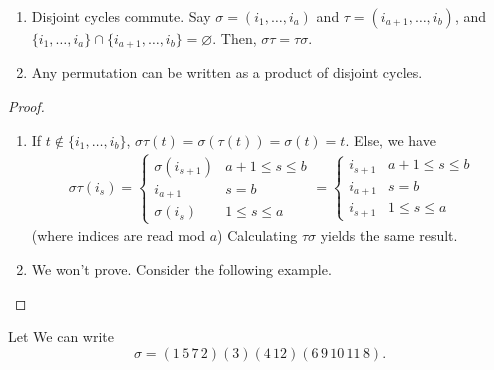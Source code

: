 \documentclass[12pt,oneside]{article}
\begin{document}
\begin{proposition}
  \begin{enumerate}
    \item Disjoint cycles commute. Say $\sigma = (i_1, \dots, i_a)$ and $\tau = (i_{a+1}, \dots, i_b)$, and $\{i_1, \dots, i_a\}\cap \{i_{a+1}, \dots, i_b\} = \varnothing$. Then, $\sigma \tau = \tau \sigma$.
    \item Any permutation can be written as a product of disjoint cycles.
  \end{enumerate}
\end{proposition}

\begin{proof}
  \begin{enumerate}
    \item If $t\notin \{i_1, \dots, i_b\}$, $\sigma \tau(t) = \sigma(\tau(t)) = \sigma (t) = t$. Else, we have \begin{align*}
      \sigma \tau (i_s) = \begin{cases}
        \sigma (i_{s+1}) & a+ 1 \leq s \leq b\\
        i_{a+1} & s = b\\
        \sigma(i_s) & 1 \leq s \leq a
      \end{cases} = \begin{cases}
        i_{s+1} & a+1 \leq s \leq b\\
        i_{a+1} & s = b\\
        i_{s+1} & 1 \leq s \leq a
      \end{cases}
    \end{align*}
    (where indices are read mod $a$) Calculating $\tau \sigma$ yields the same result.
    \item We won't prove. Consider the following example.
  \end{enumerate}
\end{proof}

\begin{example}
  Let 
   We can write \[
    \sigma = (1 \,5\, 7 \,2)(3)(4 \, 12)(6\, 9 \, 10 \, 11 \, 8).
  \]
\end{example}
\end{document}
